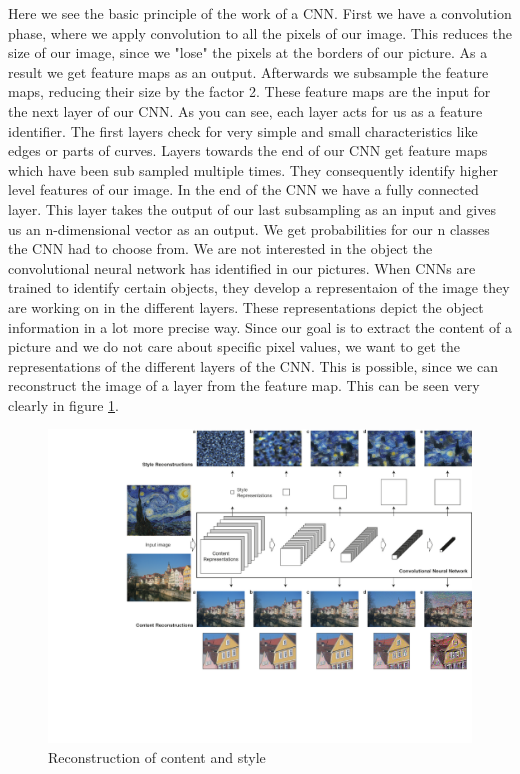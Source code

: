 \documentclass[acmtog, authorversion]{acmart}
\begin{document}
Here we see the basic principle of the work of a CNN. First we have a convolution phase, where we apply convolution to all the pixels of our image. This reduces the size of our image, since we "lose" the pixels at the borders of our picture. As a result we get feature maps as an output. Afterwards we subsample the feature maps, reducing their size by the factor 2. These feature maps are the input for the next layer of our CNN. As you can see, each layer acts for us as a feature identifier. \cite{convo} The first layers check for very simple and small characteristics like edges or parts of curves. Layers towards the end of our CNN get feature maps which have been sub sampled multiple times. They consequently identify higher level features of our image. In the end of the CNN we have a fully connected layer. This layer takes the output of our last subsampling as an input and gives us an n-dimensional vector as an output. We get probabilities for our n classes the CNN had to choose from. \citep{convo} We are not interested in the object the convolutional neural network has identified in our pictures. When CNNs are trained to identify certain objects, they develop a representaion of the image they are working on in the different layers. These representations depict the object information in a lot more precise way. \citep{Paper1} Since our goal is to extract the content of a picture and we do not care about specific pixel values, we want to get the representations of the different layers of the CNN. This is possible, since we can reconstruct the image of a layer from the feature map. This can be seen very clearly in figure \ref{fig:NetworkModel}. 
\begin{figure}
	\includegraphics[width=1\textwidth]{figures/network_model.png}
	\caption{Reconstruction of content and style \citep{Paper1}}
	\label{fig:NetworkModel}
\end{figure}
\end{document}
